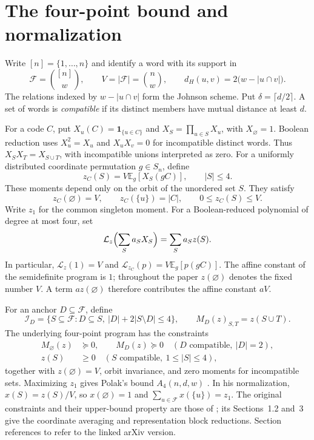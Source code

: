 \documentclass[11pt]{article}
\newcommand{\F}{\mathcal F}
\newcommand{\Lz}{\mathcal L_z}
\newcommand{\Lzc}{\mathcal L_{z_C}}
\newcommand{\E}{\mathbb E}
\newcommand{\ind}{\mathbf 1}
\begin{document}
\section{The four-point bound and normalization}\label{sec:framework}

Write $[n]=\{1,\ldots,n\}$ and identify a word with its support in
\[
 \F=\binom{[n]}w,\qquad V=|\F|=\binom nw,\qquad
 d_H(u,v)=2\bigl(w-|u\cap v|\bigr).
\]
The relations indexed by $w-|u\cap v|$ form the Johnson scheme. Put
$\delta=\lceil d/2\rceil$. A set of words is \emph{compatible} if its distinct
members have mutual distance at least $d$.

For a code $C$, put $X_u(C)=\ind_{\{u\in C\}}$ and
$X_S=\prod_{u\in S}X_u$, with $X_\varnothing=1$. Boolean reduction uses
$X_u^2=X_u$ and $X_uX_v=0$ for incompatible distinct words. Thus
$X_SX_T=X_{S\cup T}$, with incompatible unions interpreted as zero.
For a uniformly distributed coordinate permutation $g\in S_n$, define
\begin{equation}\label{eq:normalization}
 z_C(S)=V\E_g[X_S(gC)],\qquad |S|\le4.
\end{equation}
These moments depend only on the orbit of the unordered set $S$. They satisfy
\[
 z_C(\varnothing)=V,\qquad z_C(\{u\})=|C|,\qquad
 0\le z_C(S)\le V.
\]
Write $z_1$ for the common singleton moment. For a Boolean-reduced polynomial
of degree at most four, set
\[
 \Lz\Bigl(\sum_S a_SX_S\Bigr)=\sum_S a_Sz(S).
\]
In particular, $\Lz(1)=V$ and $\Lzc(p)=V\E_g[p(gC)]$.
The affine constant of the semidefinite program is $1$; throughout the paper
$z(\varnothing)$ denotes the fixed number $V$. A term $az(\varnothing)$
therefore contributes the affine constant $aV$.

For an anchor $D\subseteq\F$, define
\[
 \mathcal I_D=\{S\subseteq\F:D\subseteq S,\ |D|+2|S\setminus D|\le4\},
 \qquad M_D(z)_{S,T}=z(S\cup T).
\]
The underlying four-point program has the constraints
\begin{equation}\label{eq:polak}
 \begin{split}
 M_\varnothing(z)&\succeq0,\qquad
 M_D(z)\succeq0\quad (D\text{ compatible},\ |D|=2),\\
 z(S)&\ge0\quad (S\text{ compatible},\ 1\le|S|\le4),
 \end{split}
\end{equation}
together with $z(\varnothing)=V$, orbit invariance, and zero moments for
incompatible sets. Maximizing $z_1$ gives Polak's bound $A_4(n,d,w)$
\cite{Polak}. In his normalization, $x(S)=z(S)/V$, so
$x(\varnothing)=1$ and $\sum_{u\in\F}x(\{u\})=z_1$.
The original constraints and their upper-bound property are those of
\cite[Section~1.1]{Polak}; its Sections~1.2 and~3 give the coordinate averaging
and representation block reductions. Section references to \cite{Polak}
refer to the linked arXiv version.
\end{document}
